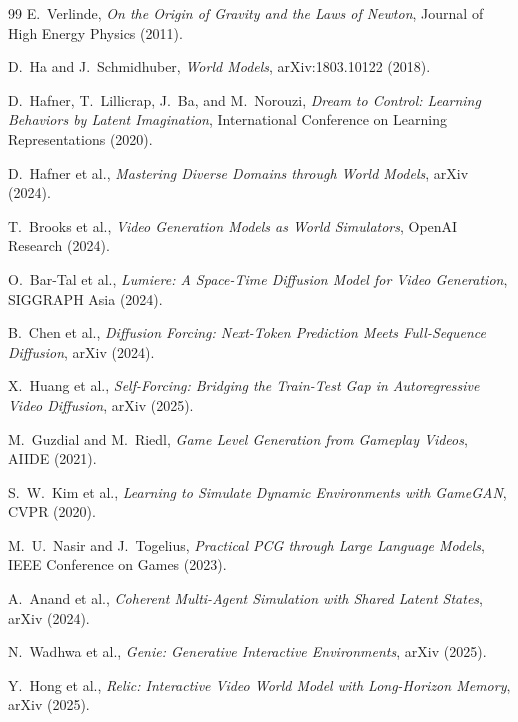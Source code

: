 \documentclass[11pt]{article}
\begin{document}
\begin{thebibliography}{99}
E.~Verlinde,
\newblock \emph{On the Origin of Gravity and the Laws of Newton},
\newblock Journal of High Energy Physics (2011).

D.~Ha and J.~Schmidhuber,
\newblock \emph{World Models},
\newblock arXiv:1803.10122 (2018).

D.~Hafner, T.~Lillicrap, J.~Ba, and M.~Norouzi,
\newblock \emph{Dream to Control: Learning Behaviors by Latent Imagination},
\newblock International Conference on Learning Representations (2020).

D.~Hafner et al.,
\newblock \emph{Mastering Diverse Domains through World Models},
\newblock arXiv (2024).

T.~Brooks et al.,
\newblock \emph{Video Generation Models as World Simulators},
\newblock OpenAI Research (2024).

O.~Bar-Tal et al.,
\newblock \emph{Lumiere: A Space-Time Diffusion Model for Video Generation},
\newblock SIGGRAPH Asia (2024).

B.~Chen et al.,
\newblock \emph{Diffusion Forcing: Next-Token Prediction Meets Full-Sequence
  Diffusion},
\newblock arXiv (2024).

X.~Huang et al.,
\newblock \emph{Self-Forcing: Bridging the Train-Test Gap in Autoregressive
  Video Diffusion},
\newblock arXiv (2025).

M.~Guzdial and M.~Riedl,
\newblock \emph{Game Level Generation from Gameplay Videos},
\newblock AIIDE (2021).

S.~W.~Kim et al.,
\newblock \emph{Learning to Simulate Dynamic Environments with GameGAN},
\newblock CVPR (2020).

M.~U.~Nasir and J.~Togelius,
\newblock \emph{Practical PCG through Large Language Models},
\newblock IEEE Conference on Games (2023).

A.~Anand et al.,
\newblock \emph{Coherent Multi-Agent Simulation with Shared Latent States},
\newblock arXiv (2024).

N.~Wadhwa et al.,
\newblock \emph{Genie: Generative Interactive Environments},
\newblock arXiv (2025).

Y.~Hong et al.,
\newblock \emph{Relic: Interactive Video World Model with Long-Horizon Memory},
\newblock arXiv (2025).


\end{thebibliography}
\end{document}
